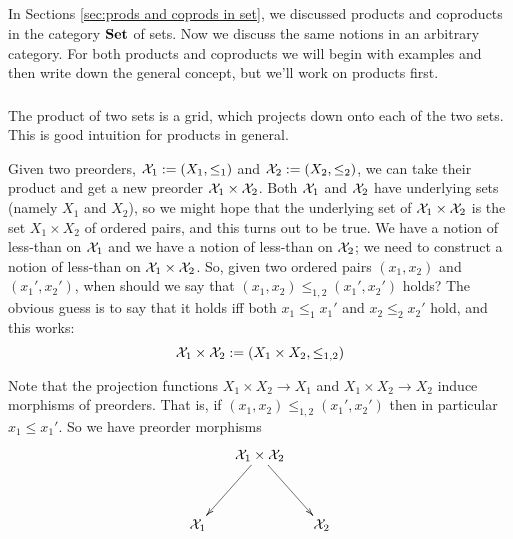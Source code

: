 \documentclass[CT4S-EN-RU]{subfiles}
\begin{document}

\subsection{}

\begin{blockENG}
In Sections \ref{sec:prods and coprods in set}, we discussed products and coproducts in the category ${\bf Set}$ of sets. Now we discuss the same notions in an arbitrary category. For both products and coproducts we will begin with examples and then write down the general concept, but we'll work on products first.
\end{blockENG}

\begin{blockRUS}
\end{blockRUS}


\subsubsection{}

\begin{blockENG}
The product of two sets is a grid, which projects down onto each of the two sets. This is good intuition for products in general.
\end{blockENG}

\begin{blockRUS}
\end{blockRUS}

\begin{exampleENG}\label{ex:product of preorders}
Given two preorders, $\mathcal{X}_1:=(X_1,\leq_1)$ and $\mathcal{X}_2:=(X_2,\leq_2)$, we can take their product and get a new preorder $\mathcal{X}_1\times\mathcal{X}_2$. Both $\mathcal{X}_1$ and $\mathcal{X}_2$ have underlying sets (namely $X_1$ and $X_2$), so we might hope that the underlying set of $\mathcal{X}_1\times\mathcal{X}_2$ is the set $X_1\times X_2$ of ordered pairs, and this turns out to be true. We have a notion of less-than on $\mathcal{X}_1$ and we have a notion of less-than on $\mathcal{X}_2$; we need to construct a notion of less-than on $\mathcal{X}_1\times\mathcal{X}_2$. So, given two ordered pairs $(x_1,x_2)$ and $(x_1',x_2')$, when should we say that $(x_1,x_2)\leq_{1,2}(x_1',x_2')$ holds? The obvious guess is to say that it holds iff both $x_1\leq_1x_1'$ and $x_2\leq_2x_2'$ hold, and this works:
$$\mathcal{X}_1\times\mathcal{X}_2:=(X_1\times X_2,\leq_{1,2})$$

Note that the projection functions $X_1\times X_2\to X_1$ and $X_1\times X_2\to X_2$ induce morphisms of preorders. That is, if $(x_1,x_2)\leq_{1,2}(x_1',x_2')$ then in particular $x_1\leq x_1'$. So we have preorder morphisms
$$\xymatrix@=15pt{&\mcX_1\times\mcX_2\ar[ldd]\ar[rdd]\\\\\mcX_1&&\mcX_2}$$
\end{exampleENG}
\end{document}
